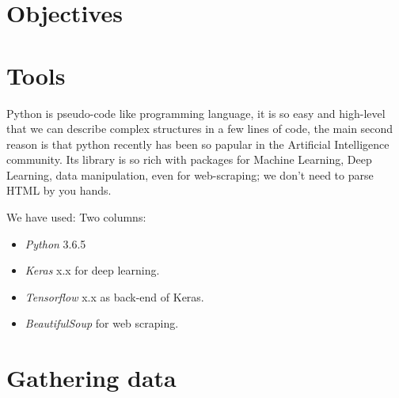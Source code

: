 \documentclass[12pt]{article}
\begin{document}
\section{Objectives}
\section{Tools}
Python is pseudo-code like programming language, it is so easy and high-level
that we can describe complex structures in a few lines of code, the main second
reason is that python recently has been so papular in the Artificial Intelligence
community. Its library is so rich with packages for Machine Learning, Deep
Learning, data manipulation, even for web-scraping; we don't need to parse HTML
by you hands.

We have used:
Two columns:
    \begin{multicols}{2}
\begin{itemize}
\item \textit{Python} 3.6.5
\item \textit{Keras} x.x for deep learning.
\item \textit{Tensorflow} x.x as back-end of Keras.
\item \textit{BeautifulSoup} for web scraping.
\end{itemize}
    \end{multicols}





\section{Gathering data}

\end{document}
